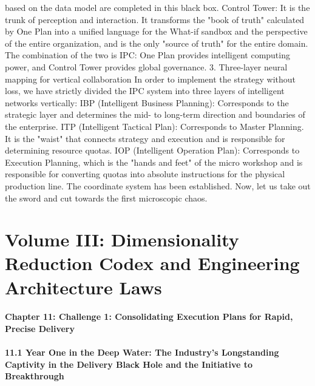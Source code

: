\documentclass[11pt,a4paper]{article}
\begin{document}
based on the data model are completed in this black box. Control Tower: It is the trunk of perception and interaction. It transforms the "book of truth" calculated by One Plan into a unified language for the What-if sandbox and the perspective of the entire organization, and is the only "source of truth" for the entire domain. The combination of the two is IPC: One Plan provides intelligent computing power, and Control Tower provides global governance. 3. Three-layer neural mapping for vertical collaboration In order to implement the strategy without loss, we have strictly divided the IPC system into three layers of intelligent networks vertically: IBP (Intelligent Business Planning): Corresponds to the strategic layer and determines the mid- to long-term direction and boundaries of the enterprise. ITP (Intelligent Tactical Plan): Corresponds to Master Planning. It is the "waist" that connects strategy and execution and is responsible for determining resource quotas. IOP (Intelligent Operation Plan): Corresponds to Execution Planning, which is the "hands and feet" of the micro workshop and is responsible for converting quotas into absolute instructions for the physical production line. The coordinate system has been established. Now, let us take out the sword and cut towards the first microscopic chaos.

\newpage
\part*{Volume III: Dimensionality Reduction Codex and Engineering Architecture Laws}

\subsection*{Chapter 11: Challenge 1: Consolidating Execution Plans for Rapid, Precise Delivery}

\subsection*{11.1 Year One in the Deep Water: The Industry’s Longstanding Captivity in the Delivery Black Hole and the Initiative to Breakthrough}
\end{document}
